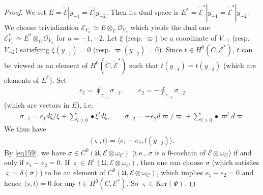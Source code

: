 \documentclass[12pt,a4paper,notitlepage]{report}
\theoremstyle{definition}
\theoremstyle{plain}
\newcommand{\fk}{\mathfrak}
\newcommand{\wtd}{\widetilde}
\newcommand{\bk}[1]{\langle {#1}\rangle}
\newcommand{\scr}{\mathscr}
\newcommand{\sgm}{\varsigma}
\newcommand{\blt}{\bullet}
\newcommand{\Cbb}{\mathbb C}
\newcommand{\Ker}{\mathrm{Ker}}
\numberwithin{equation}{section}
\begin{document}
\begin{proof}
We set $E=\wtd{\scr E}|y_{-1}=\wtd{\scr E}|y_{-2}$. Then its dual space is $E^*=\wtd{\scr E}^*|y_{-1}=\wtd{\scr E}^*|y_{-2}$. We choose trivialization $\scr E_{V_n}\simeq E\otimes_\Cbb\scr O_{V_n}$ which yields the dual one $\scr E^*_{V_n}\simeq E^*\otimes_\Cbb\scr O_{V_n}$ for $n=-1,-2$. Let $\xi$ (resp. $\varpi$) be a coordinate of $V_{-1}$ (resp. $V_{-2}$) satisfying $\xi(y_{-1})=0$ (resp. $\varpi(y_{-2})=0$). Since $t\in H^0(C,\scr E^*)$, $t$ can  be viewed as an element of $H^0(\wtd C,\wtd{\scr E}^*)$ such that $t(y_{-1})=t(y_{-2})$ (which are elements of $E^*$). Set 
\begin{align*}
e_1=\oint_{\gamma_{-1}}\sigma_{-1},\qquad e_2=-\oint_{\gamma_{-2}}\sigma_{-2}
\end{align*}
(which are vectors in $E$), i.e.
\begin{align}
\sigma_{-1}=e_1d\xi/\xi+\sum_{l\geq 0}\blt \xi^ld\xi,\qquad \sigma_{-2}=-e_2d\varpi/\varpi+\sum_{l\geq 0}\blt \varpi^ld\varpi \label{eq160}
\end{align}
We thus have
\begin{align}
\bk{\sgm,t}=\bk{e_1-e_2,t(y_{-2})}.\label{eq161}
\end{align}
By \eqref{eq159}, we have $\sigma\in C^0(\fk U,\scr E\otimes\omega_C)$ (i.e., $\sigma$ is a $0$-cochain of $\scr E\otimes\omega_C$) if and only if $e_1-e_2=0$. If $\sgm\in B^1(\fk U,\scr E\otimes\omega_C)$, then one can choose $\sigma$ (which satisfies $\sgm=\delta(\sigma)$) to be an element of $C^0(\fk U,\scr E\otimes\omega_C)$, which implies $e_1-e_2=0$ and hence $\bk{s,t}=0$ for any $t\in H^0(C,\scr E^*)$. So $\sgm\in\Ker(\Psi)$. 


\end{proof}
\end{document}
